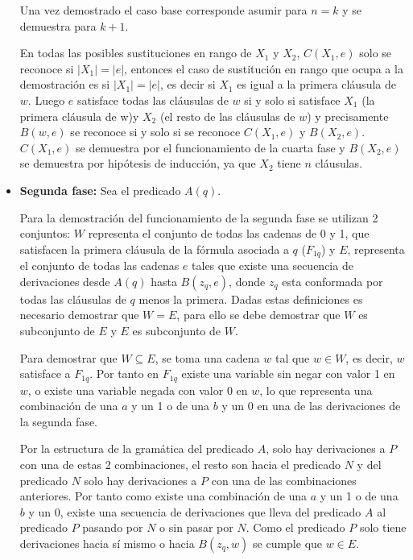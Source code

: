 \documentclass[12pt]{article}
\begin{document}
\begin{itemize}
          Una vez demostrado el caso base corresponde asumir para $n=k$ y se demuestra para $k+1$.

          En todas las posibles sustituciones en rango de $X_1$ y $X_2$, $C(X_1,e)$ solo se reconoce si $|X_1|=|e|$,
          entonces el caso de sustitución en rango que ocupa a la demostración es si $|X_1|=|e|$, es decir si $X_1$ es igual a
          la primera cláusula de $w$. Luego $e$ satisface todas las cláusulas de $w$ si y solo si satisface $X_1$
          (la primera cláusula de w)y $X_2$ (el resto de las cláusulas de $w$) y precisamente $B(w,e)$ se reconoce si y
          solo si se reconoce $C(X_1,e)$ y $B(X_2,e)$. $C(X_1,e)$ se demuestra por el funcionamiento de la cuarta fase
          y $B(X_2,e)$ se demuestra por hipótesis de inducción, ya que $X_2$ tiene $n$ cláusulas.

    \item \textbf{Segunda fase:} Sea el predicado $A(q)$.

          Para la demostración del funcionamiento de la segunda fase se utilizan 2 conjuntos: $W$ representa el
          conjunto de todas las cadenas de 0 y 1, que satisfacen la primera cláusula de la fórmula asociada a
          $q$ ($F_{1q}$) y $E$, representa el conjunto de todas las cadenas $e$ tales que existe una secuencia
          de derivaciones desde $A(q)$ hasta $B(z_q,e)$, donde $z_q$ esta conformada por todas las cláusulas de
          $q$ menos la primera. Dadas estas definiciones es necesario demostrar que $W=E$, para ello se debe
          demostrar que $W$ es subconjunto de $E$ y $E$ es subconjunto de  $W$.

          Para demostrar que $W\subseteq E$, se toma una cadena $w$ tal que $w\in W$, es decir, $w$ satisface
          a $F_{1q}$. Por tanto en $F_{1q}$ existe una variable sin negar con valor 1 en $w$, o existe una
          variable negada con valor 0 en $w$, lo que representa una combinación de una $a$ y un 1 o de una $b$
          y un 0 en una de las derivaciones de la segunda fase.

          Por la estructura de la gramática del predicado $A$, solo hay derivaciones a $P$ con una de estas 2
          combinaciones, el resto son hacia el predicado $N$ y del predicado $N$ solo hay derivaciones a $P$
          con una de las combinaciones anteriores. Por tanto como existe una combinación de una $a$ y un 1 o
          de una $b$ y un 0, existe una secuencia de derivaciones que lleva del predicado $A$ al predicado
          $P$ pasando por $N$ o sin pasar por $N$. Como el predicado $P$ solo tiene derivaciones hacia sí
          mismo o hacia $B(z_q,w)$ se cumple que $w\in E$.


\end{itemize}
\end{document}
